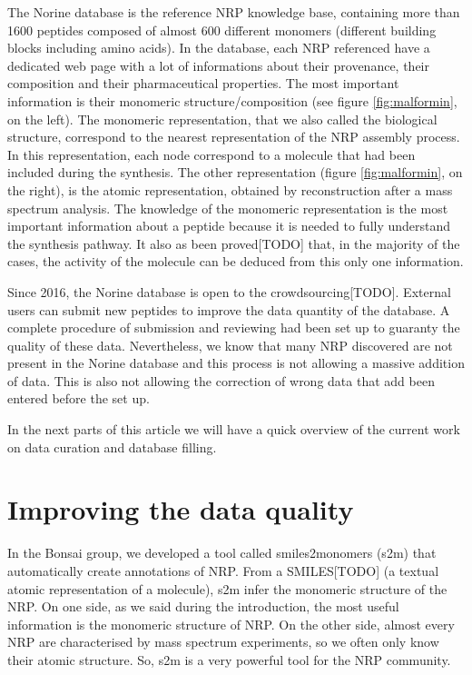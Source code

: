 \documentclass[long, final]{jobim2017}
\begin{document}
The Norine database is the reference NRP knowledge base, containing more than 1600 peptides composed of almost 600 different monomers (different building blocks including amino acids).
In the database, each NRP referenced have a dedicated web page with a lot of informations about their provenance, their composition and their pharmaceutical properties.
The most important information is their monomeric structure/composition (see figure \ref{fig:malformin}, on the left).
The monomeric representation, that we also called the biological structure, correspond to the nearest representation of the NRP assembly process.
In this representation, each node correspond to a molecule that had been included during the synthesis.
The other representation (figure \ref{fig:malformin}, on the right), is the atomic representation, obtained by reconstruction after a mass spectrum analysis.
The knowledge of the monomeric representation is the most important information about a peptide because it is needed to fully understand the synthesis pathway.
It also as been proved[TODO] that, in the majority of the cases, the activity of the molecule can be deduced from this only one information.

Since 2016, the Norine database is open to the crowdsourcing[TODO].
External users can submit new peptides to improve the data quantity of the database.
A complete procedure of submission and reviewing had been set up to guaranty the quality of these data.
Nevertheless, we know that many NRP discovered are not present in the Norine database and this process is not allowing a massive addition of data.
This is also not allowing the correction of wrong data that add been entered before the set up.

In the next parts of this article we will have a quick overview of the current work on data curation and database filling.


\section{Improving the data quality}

In the Bonsai group, we developed a tool called smiles2monomers (s2m) that automatically create annotations of NRP.
From a SMILES[TODO] (a textual atomic representation of a molecule), s2m infer the monomeric structure of the NRP.
On one side, as we said during the introduction, the most useful information is the monomeric structure of NRP.
On the other side, almost every NRP are characterised by mass spectrum experiments, so we often only know their atomic structure.
So, s2m is a very powerful tool for the NRP community.
\end{document}

